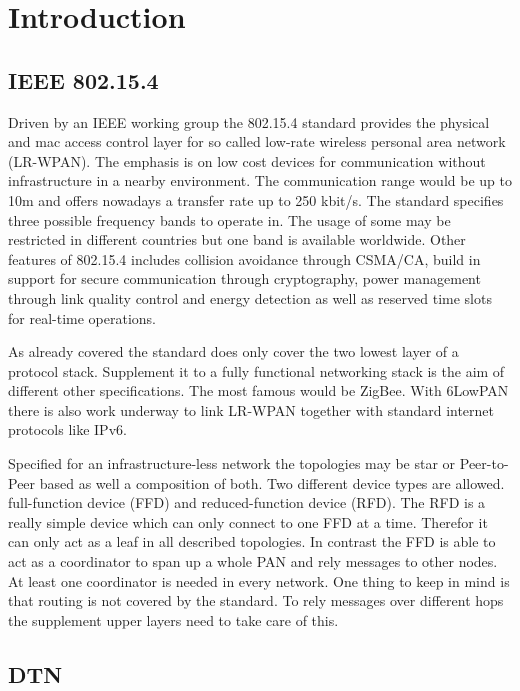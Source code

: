 \chapter{Introduction}
\cite{RFC5050}

\section{IEEE 802.15.4}

Driven by an IEEE working group the 802.15.4 standard provides the physical and
mac access control layer for so called low-rate wireless personal area network
(LR-WPAN). The emphasis is on low cost devices for communication without
infrastructure in a nearby environment. The communication range would be up to
10m and offers nowadays a transfer rate up to 250 kbit/s. The standard specifies
three possible frequency bands to operate in. The usage of some may be
restricted in different countries but one band is available worldwide. Other
features of 802.15.4 includes collision avoidance through CSMA/CA, build in
support for secure communication through cryptography, power management through
link quality control and energy detection as well as reserved time slots for
real-time operations.

As already covered the standard does only cover the two lowest layer of a
protocol stack. Supplement it to a fully functional networking stack is the aim
of different other specifications. The most famous would be ZigBee. With 6LowPAN
there is also work underway to link LR-WPAN together with standard internet
protocols like IPv6.

Specified for an infrastructure-less network the topologies may be star or
Peer-to-Peer based as well a composition of both. Two different device types are
allowed. full-function device (FFD) and reduced-function device (RFD). The RFD
is a really simple device which can only connect to one FFD at a time. Therefor
it can only act as a leaf in all described topologies. In contrast the FFD is
able to act as a coordinator to span up a whole PAN and rely messages to other
nodes. At least one coordinator is needed in every network. One thing to keep in
mind is that routing is not covered by the standard. To rely messages over
different hops the supplement upper layers need to take care of this.

\section{DTN}
